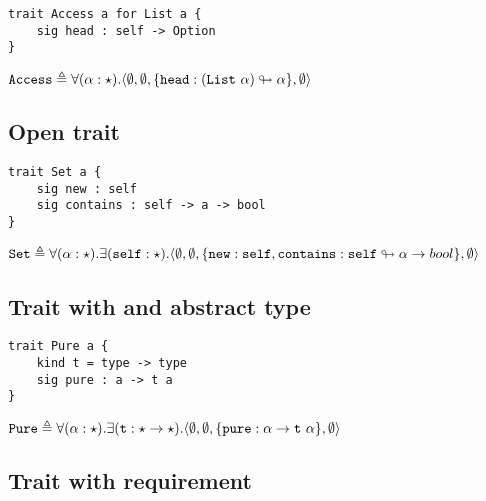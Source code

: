 \documentclass{article}[11pt]
\newcommand{\term}[1]{\verb~#1~}
\begin{document}
    \begin{verbatim}
trait Access a for List a {
    sig head : self -> Option
}
    \end{verbatim}

    \noindent\begin{math}
                 \term{Access} \triangleq \forall(\alpha:\star).\langle
                 \emptyset,
                 \emptyset,
                 \{ \term{head} : (\term{List}~\alpha) \looparrowright \alpha \},
                 \emptyset
                 \rangle
    \end{math}

    \subsection{Open trait}

    \begin{verbatim}
trait Set a {
    sig new : self
    sig contains : self -> a -> bool
}
    \end{verbatim}

    \noindent
    \begin{math}
        \term{Set} \triangleq \forall(\alpha:\star).\exists(\term{self}:\star).\langle
        \emptyset,
        \emptyset,
        \{ \term{new} : \term{self}, \term{contains} : \term{self} \looparrowright \alpha \rightarrow bool \},
        \emptyset
        \rangle
    \end{math}

    \subsection{Trait with and abstract type}

    \begin{verbatim}
trait Pure a {
    kind t = type -> type
    sig pure : a -> t a
}
    \end{verbatim}

    \noindent
    \begin{math}
        \term{Pure} \triangleq \forall(\alpha:\star).\exists(\term{t}:\star \rightarrow \star).\langle
        \emptyset,
        \emptyset,
        \{ \term{pure} : \alpha \rightarrow \term{t}~\alpha \},
        \emptyset
        \rangle
    \end{math}

    \subsection{Trait with requirement}\label{subsec:trait-with-requirement}
\end{document}
